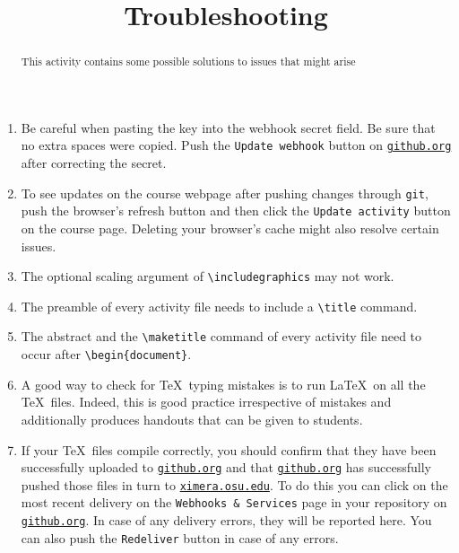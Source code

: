 \documentclass{ximera}
\title{Troubleshooting}
\begin{document}
\begin{abstract}
This activity contains some possible solutions
to issues that might arise
\end{abstract}
\maketitle
\begin{enumerate}
\item Be careful when pasting the key into
the webhook secret field. Be sure that no extra
spaces were copied. Push the \verb!Update webhook! button on
\href{http://github.org}{\tt github.org}
after correcting the secret.

\item To see updates on the course webpage
after pushing changes through \verb!git!,
push the browser's refresh button
and then click the \verb!Update activity! button 
on the course page. Deleting your browser's cache
might also resolve certain issues.

\item The optional scaling argument of \verb!\includegraphics!
may not work.

\item The preamble of every activity file needs to 
include a \verb!\title! command. 

\item The abstract 
and the \verb!\maketitle! command
of every activity file
need to occur after \verb!\begin{document}!.

\item A good way to check for \TeX\ typing mistakes
is to run \LaTeX\ on all the \TeX\ files. Indeed, this
is good practice irrespective of mistakes
and additionally produces handouts that
can be given to students.

\item If your \TeX\ files compile correctly,
you should confirm that they have been successfully uploaded to
\href{http://github.org}{\tt github.org} and that 
\href{http://github.org}{\tt github.org} has successfully
pushed those files in turn to
\href{http://ximera.osu.edu}{\tt ximera.osu.edu}.
To do this you can click on the most recent delivery
on the \verb!Webhooks & Services! page in your repository on
\href{http://github.org}{\tt github.org}.
In case of any delivery errors, they will be reported here.
You can also push the \verb!Redeliver! button
in case of any errors.

\end{enumerate}
\end{document}
